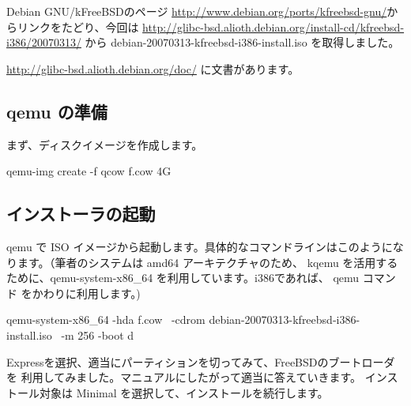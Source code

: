 \documentclass[mingoth,a4paper]{jsarticle}
\begin{document}
Debian GNU/kFreeBSDのページ
\url{http://www.debian.org/ports/kfreebsd-gnu/}からリンクをたどり、今回は
\url{http://glibc-bsd.alioth.debian.org/install-cd/kfreebsd-i386/20070313/}
から debian-20070313-kfreebsd-i386-install.iso を取得しました。

\url{http://glibc-bsd.alioth.debian.org/doc/} に文書があります。

\subsection{qemu の準備}

まず、ディスクイメージを作成します。

\begin{commandline}
qemu-img create -f qcow f.cow 4G
\end{commandline}

\subsection{インストーラの起動}

qemu で ISO イメージから起動します。具体的なコマンドラインはこのようにな
ります。（筆者のシステムは amd64 アーキテクチャのため、 kqemu を活用する
ために、qemu-system-x86\_64 を利用しています。i386であれば、 qemu コマンド
をかわりに利用します。)

\begin{commandline}
qemu-system-x86_64 -hda f.cow \
 -cdrom debian-20070313-kfreebsd-i386-install.iso \
 -m 256 -boot d 
\end{commandline}



Expressを選択、適当にパーティションを切ってみて、FreeBSDのブートローダを
利用してみました。マニュアルにしたがって適当に答えていきます。
インストール対象は Minimal を選択して、インストールを続行します。
\end{document}
